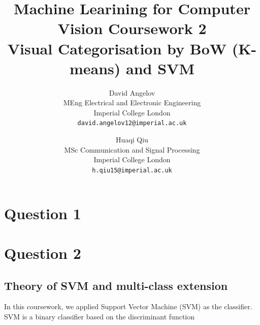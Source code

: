 \documentclass[10pt,twocolumn,letterpaper]{article}
\begin{document}
\title{Machine Learining for Computer Vision Coursework 2\\
	Visual Categorisation by BoW (K-means) and SVM
	}

\author{David Angelov\\
MEng Electrical and Electronic Engineering \\
Imperial College London\\
{\tt\small david.angelov12@imperial.ac.uk}
\and
Huaqi Qiu\\
MSc Communication and Signal Processing\\
Imperial College London\\
{\tt\small h.qiu15@imperial.ac.uk}
}

\maketitle

\section{Question 1}




\section{Question 2}

\subsection{Theory of SVM and multi-class extension}
In this coursework, we applied Support Vector Machine (SVM) as the classifier. SVM is a binary classifier based on the discriminant function
\end{document}

